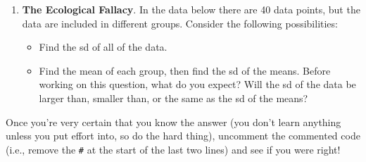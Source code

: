 \documentclass[
  letterpaper,
  DIV=11,
  numbers=noendperiod,
  oneside]{scrreprt}
\providecommand{\tightlist}{%
  \setlength{\itemsep}{0pt}\setlength{\parskip}{0pt}}\usepackage{longtable,booktabs,array}
\begin{document}
\begin{enumerate}
\def\labelenumi{\arabic{enumi}.}
\setcounter{enumi}{3}
\tightlist
\item
  \textbf{The Ecological Fallacy}. In the data below there are 40 data
  points, but the data are included in different groups. Consider the
  following possibilities:

  \begin{itemize}
  \tightlist
  \item
    Find the sd of all of the data.
  \item
    Find the mean of each group, then find the sd of the means. Before
    working on this question, what do you expect? Will the sd of the
    data be larger than, smaller than, or the same as the sd of the
    means?
  \end{itemize}
\end{enumerate}

Once you're very certain that you know the answer (you don't learn
anything unless you put effort into, so do the hard thing), uncomment
the commented code (i.e., remove the \texttt{\#} at the start of the
last two lines) and see if you were right!
\end{document}
